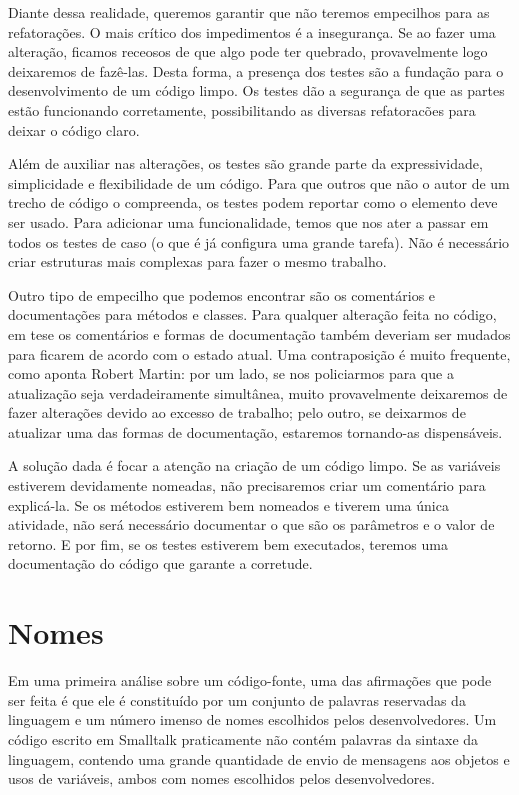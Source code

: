 Diante dessa realidade, queremos garantir que não teremos empecilhos para as refatorações.
O mais crítico dos impedimentos é a insegurança. Se ao fazer uma alteração, ficamos receosos de que algo pode ter quebrado, provavelmente logo deixaremos de fazê-las. Desta forma, a presença dos testes são a fundação para o desenvolvimento de um código limpo. Os testes dão a segurança de que as partes estão funcionando corretamente, possibilitando as diversas refatoracões para deixar o código claro.

Além de auxiliar nas alterações, os testes são grande parte da expressividade, simplicidade e flexibilidade de um código. Para que outros que não o autor de um trecho de código o compreenda, os testes podem reportar como o elemento deve ser usado. Para adicionar uma funcionalidade, temos que nos ater a passar em todos os testes de caso (o que é já configura uma grande tarefa). Não é necessário criar estruturas mais complexas para fazer o mesmo trabalho.

Outro tipo de empecilho que podemos encontrar são os comentários e documentações para métodos e classes. Para qualquer alteração feita no código, em tese os comentários e formas de documentação também deveriam ser mudados para ficarem de acordo com o estado atual. Uma contraposição é muito frequente, como aponta Robert Martin: por um lado, se nos policiarmos para que a atualização seja verdadeiramente simultânea, muito provavelmente deixaremos de fazer alterações devido ao excesso de trabalho; pelo outro, se deixarmos de atualizar uma das formas de documentação, estaremos tornando-as dispensáveis.

A solução dada é focar a atenção na criação de um código limpo. Se as variáveis estiverem devidamente nomeadas, não precisaremos criar um comentário para explicá-la. Se os métodos estiverem bem nomeados e tiverem uma única atividade, não será necessário documentar o que são os parâmetros e o valor de retorno. E por fim, se os testes estiverem bem executados, teremos uma documentação do código que garante a corretude.


\section{Nomes}
\label{sec:nomes}

Em uma primeira análise sobre um código-fonte, uma das afirmações que pode ser feita é que ele é constituído por um conjunto de palavras reservadas da linguagem e um número imenso de nomes escolhidos pelos desenvolvedores. Um código escrito em Smalltalk praticamente não contém palavras da sintaxe da linguagem, contendo uma grande quantidade de envio de mensagens aos objetos e usos de variáveis, ambos com nomes escolhidos pelos desenvolvedores.

